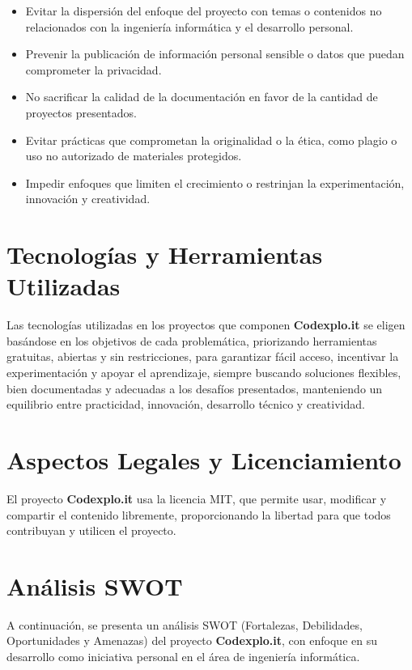 \documentclass[10pt, a4paper, oneside]{article}
\begin{document}
\begin{itemize}
    \item Evitar la dispersión del enfoque del proyecto con temas o contenidos no relacionados con la ingeniería informática y el desarrollo personal.
    \item Prevenir la publicación de información personal sensible o datos que puedan comprometer la privacidad.
    \item No sacrificar la calidad de la documentación en favor de la cantidad de proyectos presentados.
    \item Evitar prácticas que comprometan la originalidad o la ética, como plagio o uso no autorizado de materiales protegidos.
    \item Impedir enfoques que limiten el crecimiento o restrinjan la experimentación, innovación y creatividad.
\end{itemize}

\section{Tecnologías y Herramientas Utilizadas}

Las tecnologías utilizadas en los proyectos que componen \textbf{Codexplo.it} se eligen basándose en los objetivos de cada problemática, priorizando herramientas gratuitas, abiertas y sin restricciones, para garantizar fácil acceso, incentivar la experimentación y apoyar el aprendizaje, siempre buscando soluciones flexibles, bien documentadas y adecuadas a los desafíos presentados, manteniendo un equilibrio entre practicidad, innovación, desarrollo técnico y creatividad.

\section{Aspectos Legales y Licenciamiento}

El proyecto \textbf{Codexplo.it} usa la licencia MIT, que permite usar, modificar y compartir el contenido libremente, proporcionando la libertad para que todos contribuyan y utilicen el proyecto.

\section{Análisis SWOT}

A continuación, se presenta un análisis SWOT (Fortalezas, Debilidades, Oportunidades y Amenazas) del proyecto \textbf{Codexplo.it}, con enfoque en su desarrollo como iniciativa personal en el área de ingeniería informática.
\end{document}
